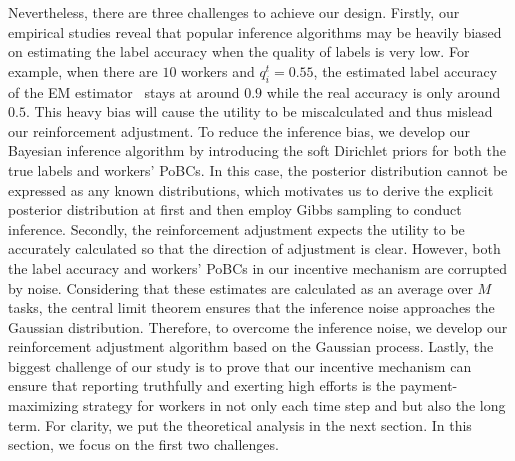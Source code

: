 \documentclass{article}
\begin{document}
Nevertheless, there are three challenges to achieve our design. Firstly, our empirical studies reveal that popular inference algorithms may be heavily biased on estimating the label accuracy when the quality of labels is very low. For example, when there are $10$ workers and $q_i^t=0.55$, the estimated label accuracy of the EM estimator~\cite{dawid1979maximum,raykar2010learning} stays at around $0.9$ while the real accuracy is only around $0.5$.
This heavy bias will cause the utility to be miscalculated and thus mislead our reinforcement adjustment.
To reduce the inference bias, we develop our Bayesian inference algorithm by introducing the soft Dirichlet priors for both the true labels and workers' PoBCs.
In this case, the posterior distribution cannot be expressed as any known distributions, which motivates us to derive the explicit posterior distribution at first and then employ Gibbs sampling to conduct inference.
{\color{red}Secondly, the reinforcement adjustment expects the utility to be accurately calculated so that the direction of adjustment is clear.
However, both the label accuracy and workers' PoBCs in our incentive mechanism are corrupted by noise.
Considering that these estimates are calculated as an average over $M$ tasks, the central limit theorem ensures that the inference noise approaches the Gaussian distribution.
Therefore, to overcome the inference noise, we develop our reinforcement adjustment algorithm based on the Gaussian process.}
Lastly, the biggest challenge of our study is to prove that our incentive mechanism can ensure that reporting truthfully and exerting high efforts is the payment-maximizing strategy for workers in not only each time step and but also the long term.
For clarity, we put the theoretical analysis in the next section.
In this section, we focus on the first two challenges.


\end{document}
